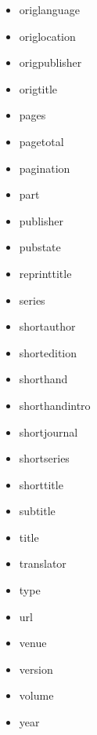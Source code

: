 \documentclass{article}
\begin{document}
\begin{itemize}
\begin{multicols}{4}
\begin{itemize}
        \item origlanguage
        \item origlocation
        \item origpublisher
        \item origtitle
        \item pages
        \item pagetotal
        \item pagination
        \item part
        \item publisher
        \item pubstate
        \item reprinttitle
        \item series
        \item shortauthor
        \item shortedition
        \item shorthand
        \item shorthandintro
        \item shortjournal
        \item shortseries
        \item shorttitle
        \item subtitle
        \item title
        \item translator
        \item type
        \item url
        \item venue
        \item version
        \item volume
        \item year
    \end{itemize}
    \end{multicols}

\end{itemize}
\end{document}
